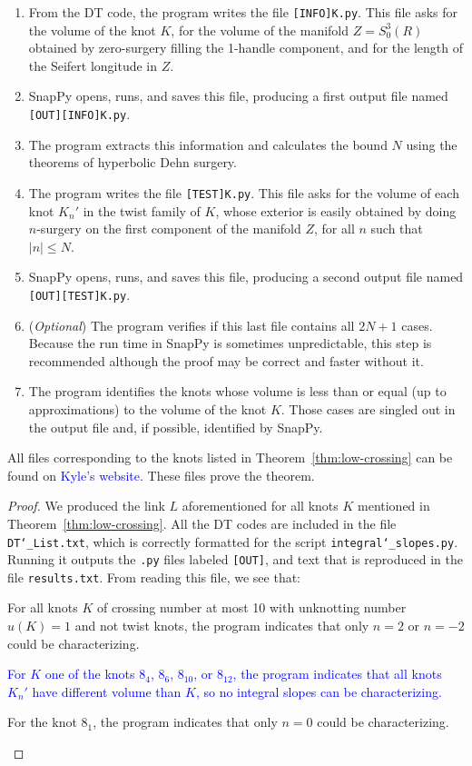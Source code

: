 \documentclass[11pt,usenames,dvipsnames,reqno]{amsart}
\numberwithin{theorem}{section}
\theoremstyle{ex}
\theoremstyle{rem}
\def\kh#1{\textcolor{Blue}{#1}}
\begin{document}
\begin{enumerate}
	\item From the DT code, the program writes the file \texttt{[INFO]K.py}. This file asks for the volume of the knot $K$, for the volume of the manifold $Z = S_0^3(R)$ obtained by zero-surgery filling the 1-handle component, and for the length of the Seifert longitude in $Z$.
	\item SnapPy opens, runs, and saves this file, producing a first output file named \texttt{[OUT][INFO]K.py}.
	\item The program extracts this information and calculates the bound $N$ using the theorems of hyperbolic Dehn surgery.
	\item The program writes the file \texttt{[TEST]K.py}. This file asks for the volume of each knot $K_{n}'$ in the twist family of $K$, whose exterior is easily obtained by doing $n$-surgery on the first component of the manifold $Z$, for all $n$ such that $|n| \leq N$.
	\item SnapPy opens, runs, and saves this file, producing a second output file named \texttt{[OUT][TEST]K.py}.
	\item (\textit{Optional}) The program verifies if this last file contains all $2 N + 1$ cases. Because the run time in SnapPy is sometimes unpredictable, this step is recommended although the proof may be correct and faster without it.
	\item The program identifies the knots whose volume is less than or equal (up to approximations) to the volume of the knot $K$. Those cases are singled out in the output file and, if possible, identified by SnapPy.
\end{enumerate}

All files corresponding to the knots listed in Theorem~\ref{thm:low-crossing} can be found on \kh{Kyle's website}. These files prove the theorem.

\begin{proof} We produced the link $L$ aforementioned for all knots $K$ mentioned in Theorem~\ref{thm:low-crossing}. All the DT codes are included in the file \texttt{DT\char`_List.txt}, which is correctly formatted for the script \texttt{integral\char`_slopes.py}. Running it outputs the \texttt{.py} files labeled \texttt{[OUT]}, and text that is reproduced in the file \texttt{results.txt}. From reading this file, we see that:
	\begin{enumerate}[label=\normalfont (\alph*)]
		\item For all knots $K$ of crossing number at most 10 with unknotting number $u(K) = 1$ and not twist knots, the program indicates that only $n = 2$ or $n = -2$ could be characterizing.
		\kh{\item For $K$ one of the knots $8_4$, $8_6$, $8_{10}$, or $8_{12}$, the program indicates that all knots $K_{n}'$ have different volume than $K$, so no integral slopes can be characterizing.}
		\item For the knot $8_1$, the program indicates that only $n = 0$ could be characterizing.
	\end{enumerate}
\end{proof}
\end{document}
